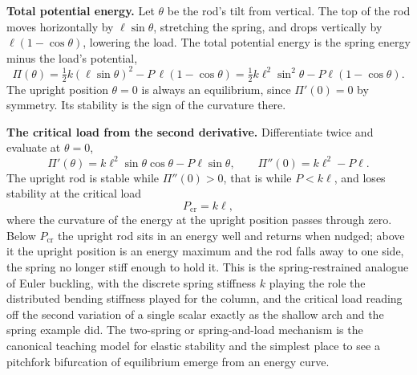 \textbf{Total potential energy.} Let $\theta$ be the rod's tilt from
vertical. The top of the rod moves horizontally by $\ell\sin\theta$,
stretching the spring, and drops vertically by $\ell(1 - \cos\theta)$,
lowering the load. The total potential energy is the spring energy minus the
load's potential,
\[
\Pi(\theta) = \tfrac12 k (\ell\sin\theta)^2 - P\,\ell(1 - \cos\theta)
= \tfrac12 k \ell^2\sin^2\theta - P\ell(1 - \cos\theta).
\]
The upright position $\theta = 0$ is always an equilibrium, since $\Pi'(0) =
0$ by symmetry. Its stability is the sign of the curvature there.

\textbf{The critical load from the second derivative.} Differentiate twice
and evaluate at $\theta = 0$,
\[
\Pi'(\theta) = k\ell^2\sin\theta\cos\theta - P\ell\sin\theta,
\qquad
\Pi''(0) = k\ell^2 - P\ell.
\]
The upright rod is stable while $\Pi''(0) > 0$, that is while $P < k\ell$,
and loses stability at the critical load
\[
P_\text{cr} = k\ell,
\]
where the curvature of the energy at the upright position passes through
zero. Below $P_\text{cr}$ the upright rod sits in an energy well and returns
when nudged; above it the upright position is an energy maximum and the rod
falls away to one side, the spring no longer stiff enough to hold it. This
is the spring-restrained analogue of Euler buckling, with the discrete
spring stiffness $k$ playing the role the distributed bending stiffness
played for the column, and the critical load reading off the second
variation of a single scalar exactly as the shallow arch and the spring
example did. The two-spring or spring-and-load mechanism is the canonical
teaching model for elastic stability and the simplest place to see a
pitchfork bifurcation of equilibrium emerge from an energy curve.

